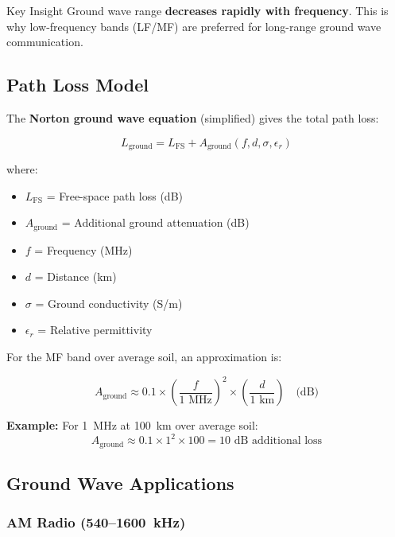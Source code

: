 \begin{importantbox}{Key Insight}
Ground wave range \textbf{decreases rapidly with frequency}. This is why low-frequency bands (LF/MF) are preferred for long-range ground wave communication.
\end{importantbox}

\subsection{Path Loss Model}

The \textbf{Norton ground wave equation} (simplified) gives the total path loss:

\begin{equation}
\label{eq:ground-wave-loss}
L_{\text{ground}} = L_{\text{FS}} + A_{\text{ground}}(f, d, \sigma, \epsilon_r)
\end{equation}

where:
\begin{itemize}
\item $L_{\text{FS}}$ = Free-space path loss (dB)
\item $A_{\text{ground}}$ = Additional ground attenuation (dB)
\item $f$ = Frequency (MHz)
\item $d$ = Distance (km)
\item $\sigma$ = Ground conductivity (S/m)
\item $\epsilon_r$ = Relative permittivity
\end{itemize}

For the MF band over average soil, an approximation is:

\begin{equation}
\label{eq:ground-attenuation}
A_{\text{ground}} \approx 0.1 \times \left(\frac{f}{1\text{ MHz}}\right)^2 \times \left(\frac{d}{1\text{ km}}\right) \quad \text{(dB)}
\end{equation}

\textbf{Example:} For 1~MHz at 100~km over average soil:
\begin{equation}
A_{\text{ground}} \approx 0.1 \times 1^2 \times 100 = 10\text{ dB additional loss}
\end{equation}

\subsection{Ground Wave Applications}

\subsubsection{AM Radio (540--1600~kHz)}

